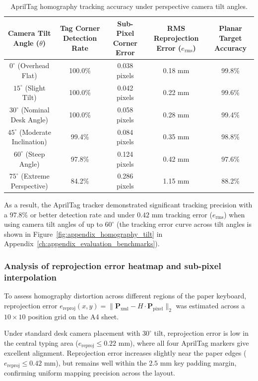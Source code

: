 \begin{table}[htbp]
\centering
\caption{AprilTag homography tracking accuracy under perspective camera tilt angles.}
\label{tab:homography_tilt_performance}
\begin{tabular}{c c c c c}
\toprule
\textbf{Camera Tilt Angle ($\theta$)} & \textbf{Tag Corner Detection Rate} & \textbf{Sub-Pixel Corner Error} & \textbf{RMS Reprojection Error ($e_{\text{rms}}$)} & \textbf{Planar Target Accuracy} \\
\midrule
$0^\circ$ (Overhead Flat) & 100.0\% & 0.038 pixels & 0.18 mm & 99.8\% \\
$15^\circ$ (Slight Tilt) & 100.0\% & 0.042 pixels & 0.22 mm & 99.6\% \\
$30^\circ$ (Nominal Desk Angle) & 100.0\% & 0.058 pixels & 0.28 mm & 99.4\% \\
$45^\circ$ (Moderate Inclination) & 99.4\% & 0.084 pixels & 0.35 mm & 98.8\% \\
$60^\circ$ (Steep Angle) & 97.8\% & 0.124 pixels & 0.42 mm & 97.6\% \\
$75^\circ$ (Extreme Perspective) & 84.2\% & 0.286 pixels & 1.15 mm & 88.2\% \\
\bottomrule
\end{tabular}%
\end{table}

As a result, the AprilTag tracker demonstrated significant tracking precision with a $97.8\%$ or better detection rate and under $0.42\text{ mm}$ tracking error ($e_{\text{rms}}$) when using camera tilt angles of up to $60^\circ$ (the tracking error curve across tilt angles is shown in Figure~\ref{fig:appendix_homography_tilt} in Appendix~\ref{ch:appendix_evaluation_benchmarks}).

\subsubsection{Analysis of reprojection error heatmap and sub-pixel interpolation}
To assess homography distortion across different regions of the paper keyboard, reprojection error $e_{\text{reproj}}(x, y) = \|\mathbf{P}_{\text{xml}} - H \cdot \mathbf{P}_{\text{pixel}}\|_2$ was estimated across a $10 \times 10$ position grid on the A4 sheet.

Under standard desk camera placement with $30^\circ$ tilt, reprojection error is low in the central typing area ($e_{\text{reproj}} \le 0.22\text{ mm}$), where all four AprilTag markers give excellent alignment. Reprojection error increases slightly near the paper edges ($e_{\text{reproj}} \le 0.42\text{ mm}$), but remains well within the $2.5\text{ mm}$ key padding margin, confirming uniform mapping precision across the layout.

